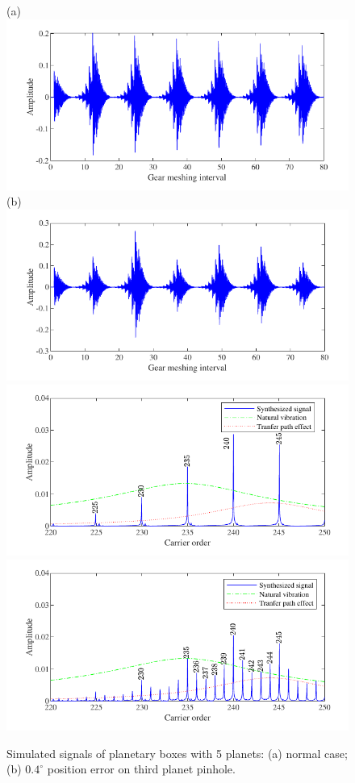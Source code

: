 \documentclass[a4paper,fleqn]{cas-sc}%
\begin{document}
\begin{figure}[pos=htbp]
    \centering
    (a) \includegraphics[scale=\myscale,valign=t]{Time_p5_normal.pdf}
    (b) \includegraphics[scale=\myscale,valign=t]{Time_p5_fault.pdf}\\
    \hspace*{1.5em}\includegraphics[scale=\myscale,valign=t]{Freq_p5_normal.pdf}
    \hspace*{1.5em}\includegraphics[scale=\myscale,valign=t]{Freq_p5_fault.pdf}
    \caption{Simulated signals of planetary boxes with 5 planets: (a) normal case; (b) $0.4^\circ$ position error on third planet pinhole.}
    \label{fig:simulated_p5}
\end{figure}
\end{document}
